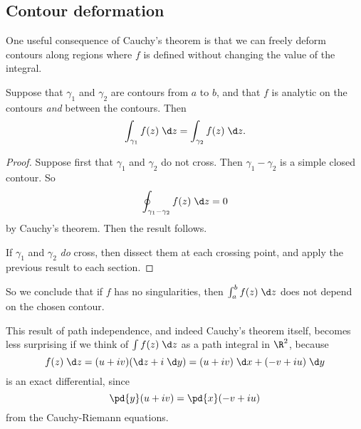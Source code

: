 \documentclass[a4paper]{article}
\begin{document}
\subsection{Contour deformation}
One useful consequence of Cauchy's theorem is that we can freely deform contours along regions where $f$ is defined without changing the value of the integral.
\begin{prop}
  Suppose that $\gamma_1$ and $\gamma_2$ are contours from $a$ to $b$, and that $f$ is analytic on the contours \emph{and} between the contours. Then
  \[
    \int_{\gamma_1}f(z)\;\d z = \int_{\gamma_2} f(z)\;\d z.
  \]
\end{prop}
\begin{center}
\end{center}

\begin{proof}
  Suppose first that $\gamma_1$ and $\gamma_2$ do not cross. Then $\gamma_1 - \gamma_2$ is a simple closed contour. So
  \[
    \oint_{\gamma_1 - \gamma_2} f(z)\;\d z = 0
  \]
  by Cauchy's theorem. Then the result follows.

  If $\gamma_1$ and $\gamma_2$ \emph{do} cross, then dissect them at each crossing point, and apply the previous result to each section.
\end{proof}
So we conclude that if $f$ has no singularities, then $\int_a^b f(z)\;\d z$ does not depend on the chosen contour.

This result of path independence, and indeed Cauchy's theorem itself, becomes less surprising if we think of $\int f(z)\;\d z$ as a path integral in $\R^2$, because
\[
  f(z)\;\d z = (u + iv)(\d z + i\;\d y) = (u + iv) \;\d x + (-v + iu)\;\d y
\]
is an exact differential, since
\[
  \pd{y} (u + iv) = \pd{x} (-v + iu)
\]
from the Cauchy-Riemann equations.
\end{document}
